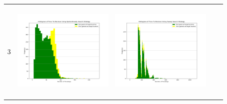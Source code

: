 \begin{landscape}
\begin{table}[h!]
\begin{tabular}{ | c | c | c | c | c |}
    3 & 
    \begin{minipage}[c][49mm][c]{49mm}
      \includegraphics[width=49mm, height=49mm]{Chapters/MultiAgentTargetDetection/Figs/Histograms/MultipleAgent/3/SingleAgentSingleSource3EpsilonGreedyHistogram.png}
    \end{minipage}
    &
    \begin{minipage}[c][49mm][c]{49mm}
      \includegraphics[width=49mm, height=49mm]{Chapters/MultiAgentTargetDetection/Figs/Histograms/MultipleAgent/3/SingleAgentSingleSource3SweepHistogram.png}


\end{minipage}
\end{tabular}
\end{table}
\end{landscape}
